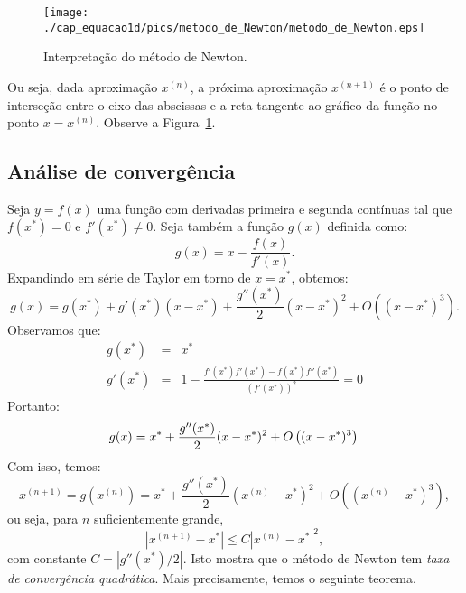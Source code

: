 \begin{figure}[h]
  \centering
  \texttt{[image: ./cap\_equacao1d/pics/metodo\_de\_Newton/metodo\_de\_Newton.eps]}
  \caption{Interpretação do método de Newton.}
  \label{fig:metodo_de_Newton}
\end{figure}

Ou seja, dada aproximação $x^{(n)}$, a próxima aproximação $x^{(n+1)}$ é o ponto de interseção entre o eixo das abscissas e a reta tangente ao gráfico da função no ponto $x = x^{(n)}$. Observe a Figura~\ref{fig:metodo_de_Newton}.

\subsection{Análise de convergência}\label{Analise_conv_Newton}

Seja $y = f(x)$ uma função com derivadas primeira e segunda contínuas tal que $f(x^*)=0$ e $f'(x^*)\neq 0$. Seja também a função $g(x)$ definida como:
\begin{equation}
  g(x)=x-\frac{f(x)}{f'(x)}.
\end{equation}
Expandindo em série de Taylor em torno de $x = x^*$, obtemos:
\begin{equation}
  g(x)=g(x^*)+g'(x^*)(x-x^*) + \frac{g''(x^*)}{2}(x-x^*)^2 + O\left((x-x^*)^3\right).
\end{equation}
Observamos que:
\begin{eqnarray}
g(x^*) &=& x^*\\
g'(x^*) &=& 1 - \frac{f'(x^*)f'(x^*)-f(x^*)f''(x^*)}{\left(f'(x^*)\right)^2} = 0
\end{eqnarray}
Portanto:
\begin{equation}
g(x) = x^* + \frac{g''(x^*)}{2}(x-x^*)^2 + O\left((x-x^*)^3\right)\\
\end{equation}
Com isso, temos:
\begin{equation}
x^{(n+1)} = g(x^{(n)}) =  x^*+ \frac{g''(x^*)}{2}(x^{(n)}-x^*)^2 + O\left((x^{(n)}-x^*)^3\right),
\end{equation}
ou seja, para $n$ suficientemente grande,
\begin{equation}
\left|x^{(n+1)}-x^*\right| \leq C\left|x^{(n)}-x^*\right|^2,
\end{equation}
com constante $C = \left|g''(x^*)/2\right|$. Isto mostra que o método de Newton tem \emph{taxa de convergência quadrática}. Mais precisamente, temos o seguinte teorema.

